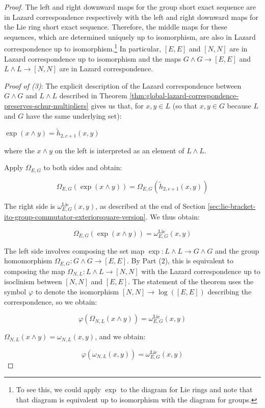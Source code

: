 \documentclass{ucetd}
\begin{document}
\begin{proof}
  The left and right downward maps for the group short exact sequence
  are in Lazard correspondence respectively with the left and right
  downward maps for the Lie ring short exact sequence. Therefore, the
  middle maps for these sequences, which are determined uniquely up to
  isomorphism, are also in Lazard correspondence up to
  isomorphism.\footnote{To see this, we could apply $\exp$ to the
    diagram for Lie rings and note that that diagram is equivalent up
    to isomorphism with the diagram for groups.} In particular, $[E,E]$
  and $[N,N]$ are in Lazard correspondence up to isomorphism and the
  maps $G \wedge G \to [E,E]$ and $L \wedge L \to [N,N]$ are in
  Lazard correspondence.

  {\em Proof of (3)}: The explicit description of the Lazard
  correspondence between $G \wedge G$ and $L \wedge L$ described in
  Theorem
  \ref{thm:global-lazard-correspondence-preserves-schur-multipliers}
  gives us that, for $x,y \in L$ (so that $x,y \in G$ because $L$ and
  $G$ have the same underlying set):

  $\exp(x \wedge y) = \tilde{h}_{2,c+1}(x,y)$

  where the $x \wedge y$ on the left is interpreted as an element of
  $L \wedge L$.

  Apply $\Omega_{E,G}$ to both sides and obtain:

  $$\Omega_{E,G}(\exp(x \wedge y)) = \Omega_{E,G}(\tilde{h}_{2,c+1}(x,y))$$

  The right side is $\omega_{E,G}^{\text{Lie}}(x,y)$, as described at
  the end of Section
  \ref{sec:lie-bracket-ito-group-commutator-exteriorsquare-version}. We thus obtain:

  $$\Omega_{E,G}(\exp(x \wedge y)) = \omega_{E,G}^{\text{Lie}}(x,y)$$

  The left side involves composing the set map $\exp: L \wedge L \to G
  \wedge G$ and the group homomorphism $\Omega_{E,G}: G \wedge G
  \to[E,E]$. By Part (2), this is equivalent to composing the map
  $\Omega_{N,L}:L \wedge L \to [N,N]$ with the Lazard correspondence
  up to isoclinism between $[N,N]$ and $[E,E]$. The statement of the
  theorem uses the symbol $\varphi$ to denote the isomorphism $[N,N]
  \to \log([E,E])$ describing the correspondence, so we obtain:

  $$\varphi(\Omega_{N,L}(x \wedge y)) = \omega_{E,G}^{\text{Lie}}(x,y)$$

  $\Omega_{N,L}(x \wedge y) = \omega_{N,L}(x,y)$, and we obtain:

  $$\varphi(\omega_{N,L}(x,y)) = \omega_{E,G}^{\text{Lie}}(x,y)$$


\end{proof}
\end{document}
